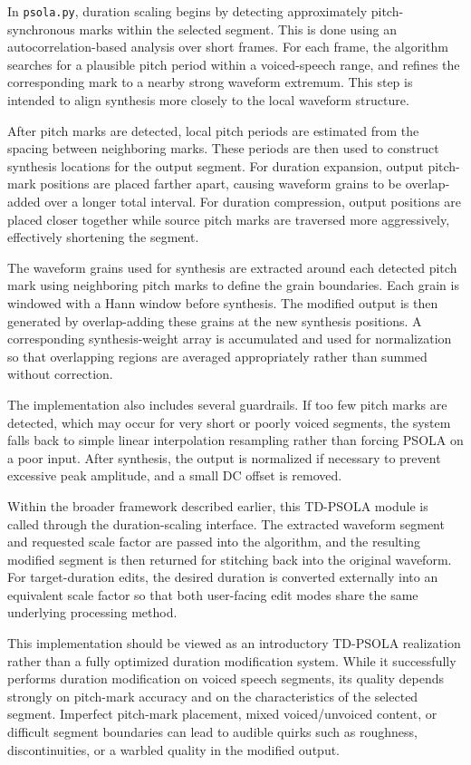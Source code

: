 \documentclass{article}
\begin{document}
In \texttt{psola.py}, duration scaling begins by detecting approximately pitch-synchronous marks within the selected segment. This is done using an autocorrelation-based analysis over short frames. For each frame, the algorithm searches for a plausible pitch period within a voiced-speech range, and refines the corresponding mark to a nearby strong waveform extremum. This step is intended to align synthesis more closely to the local waveform structure.

After pitch marks are detected, local pitch periods are estimated from the spacing between neighboring marks. These periods are then used to construct synthesis locations for the output segment. For duration expansion, output pitch-mark positions are placed farther apart, causing waveform grains to be overlap-added over a longer total interval. For duration compression, output positions are placed closer together while source pitch marks are traversed more aggressively, effectively shortening the segment.

The waveform grains used for synthesis are extracted around each detected pitch mark using neighboring pitch marks to define the grain boundaries. Each grain is windowed with a Hann window before synthesis. The modified output is then generated by overlap-adding these grains at the new synthesis positions. A corresponding synthesis-weight array is accumulated and used for normalization so that overlapping regions are averaged appropriately rather than summed without correction.

The implementation also includes several guardrails. If too few pitch marks are detected, which may occur for very short or poorly voiced segments, the system falls back to simple linear interpolation resampling rather than forcing PSOLA on a poor input. After synthesis, the output is normalized if necessary to prevent excessive peak amplitude, and a small DC offset is removed.

Within the broader framework described earlier, this TD-PSOLA module is called through the duration-scaling interface. The extracted waveform segment and requested scale factor are passed into the algorithm, and the resulting modified segment is then returned for stitching back into the original waveform. For target-duration edits, the desired duration is converted externally into an equivalent scale factor so that both user-facing edit modes share the same underlying processing method.

This implementation should be viewed as an introductory TD-PSOLA realization rather than a fully optimized duration modification system. While it successfully performs duration modification on voiced speech segments, its quality depends strongly on pitch-mark accuracy and on the characteristics of the selected segment. Imperfect pitch-mark placement, mixed voiced/unvoiced content, or difficult segment boundaries can lead to audible quirks such as roughness, discontinuities, or a warbled quality in the modified output.
\end{document}
